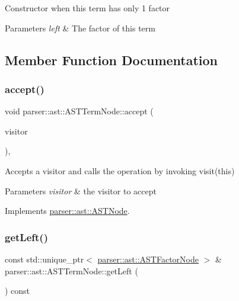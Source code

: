 Constructor when this term has only 1 factor 
\begin{DoxyParams}{Parameters}
{\em left} & The factor of this term \\
\hline
\end{DoxyParams}


\subsection{Member Function Documentation}
\mbox{\label{classparser_1_1ast_1_1ASTTermNode_a4937651cff0fac499c76f8f38fa4795d}} 
\subsubsection{\texorpdfstring{accept()}{accept()}}
{\footnotesize\ttfamily void parser\+::ast\+::\+A\+S\+T\+Term\+Node\+::accept (\begin{DoxyParamCaption}\item[{\hyperlink{classvisitor_1_1Visitor}{visitor\+::\+Visitor} $\ast$}]{visitor }\end{DoxyParamCaption})\hspace{0.3cm}{\ttfamily [override]}, {\ttfamily [virtual]}}

Accepts a visitor and calls the operation by invoking {\ttfamily visit(this)} 
\begin{DoxyParams}{Parameters}
{\em visitor} & the visitor to accept \\
\hline
\end{DoxyParams}


Implements \hyperlink{classparser_1_1ast_1_1ASTNode_a3ff84fdfdbbc5c39b70b4d04c22e7dc3}{parser\+::ast\+::\+A\+S\+T\+Node}.

\mbox{\label{classparser_1_1ast_1_1ASTTermNode_a33fd3c6c4e20f282adac752fa222d569}} 
\subsubsection{\texorpdfstring{get\+Left()}{getLeft()}}
{\footnotesize\ttfamily const std\+::unique\+\_\+ptr$<$ \hyperlink{classparser_1_1ast_1_1ASTFactorNode}{parser\+::ast\+::\+A\+S\+T\+Factor\+Node} $>$ \& parser\+::ast\+::\+A\+S\+T\+Term\+Node\+::get\+Left (\begin{DoxyParamCaption}{ }\end{DoxyParamCaption}) const}


